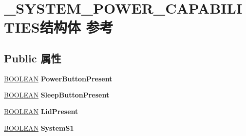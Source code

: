 \hypertarget{struct___s_y_s_t_e_m___p_o_w_e_r___c_a_p_a_b_i_l_i_t_i_e_s}{}\section{\+\_\+\+S\+Y\+S\+T\+E\+M\+\_\+\+P\+O\+W\+E\+R\+\_\+\+C\+A\+P\+A\+B\+I\+L\+I\+T\+I\+E\+S结构体 参考}
\label{struct___s_y_s_t_e_m___p_o_w_e_r___c_a_p_a_b_i_l_i_t_i_e_s}
\subsection*{Public 属性}
\begin{DoxyCompactItemize}
\item 
\mbox{\label{struct___s_y_s_t_e_m___p_o_w_e_r___c_a_p_a_b_i_l_i_t_i_e_s_a281855221a711816eb162666feb4c96f}} 
\hyperlink{_processor_bind_8h_a112e3146cb38b6ee95e64d85842e380a}{B\+O\+O\+L\+E\+AN} {\bfseries Power\+Button\+Present}
\item 
\mbox{\label{struct___s_y_s_t_e_m___p_o_w_e_r___c_a_p_a_b_i_l_i_t_i_e_s_a27e31573a003dd12d88b799563ed9a98}} 
\hyperlink{_processor_bind_8h_a112e3146cb38b6ee95e64d85842e380a}{B\+O\+O\+L\+E\+AN} {\bfseries Sleep\+Button\+Present}
\item 
\mbox{\label{struct___s_y_s_t_e_m___p_o_w_e_r___c_a_p_a_b_i_l_i_t_i_e_s_a9c4dd95ed18278b178cab04de9751abd}} 
\hyperlink{_processor_bind_8h_a112e3146cb38b6ee95e64d85842e380a}{B\+O\+O\+L\+E\+AN} {\bfseries Lid\+Present}
\item 
\mbox{\label{struct___s_y_s_t_e_m___p_o_w_e_r___c_a_p_a_b_i_l_i_t_i_e_s_a0d0cf31e9b001c3531e6f77a8528a29a}} 
\hyperlink{_processor_bind_8h_a112e3146cb38b6ee95e64d85842e380a}{B\+O\+O\+L\+E\+AN} {\bfseries System\+S1}
\item 
\mbox{\label{struct___s_y_s_t_e_m___p_o_w_e_r___c_a_p_a_b_i_l_i_t_i_e_s_a6b739b11b4647549ecec3422d5e28bbc}} 

\end{DoxyCompactItemize}
